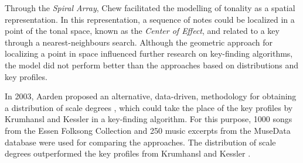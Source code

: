 
Through the \emph{Spiral Array}, Chew \cite{chew2002spiral}
facilitated the modelling of tonality as a spatial
representation. In this representation, a sequence of notes
could be localized in a point of the tonal space, known as
the \emph{Center of Effect}, and related to a key through a
nearest-neighbours search. Although the geometric approach
for localizing a point in space influenced further research
on key-finding algorithms, the model did not perform better
than the approaches based on distributions and key profiles.


In 2003, Aarden proposed an alternative, data-driven,
methodology for obtaining a distribution of scale degrees
\cite{aarden2003dynamic}, which could take the place of the
key profiles by Krumhansl and Kessler
\cite{krumhansl1982tracing} in a key-finding algorithm. For
this purpose, 1000 songs from the Essen Folksong Collection
and 250 music excerpts from the MuseData database were used
for comparing the approaches. The distribution of scale
degrees outperformed the key profiles from Krumhansl and
Kessler \cite{krumhansl1982tracing}.





